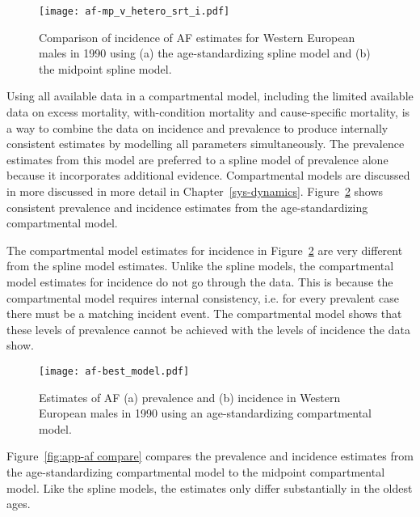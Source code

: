     \begin{figure}[h]
        \begin{center}
            \texttt{[image: af-mp\_v\_hetero\_srt\_i.pdf]}
            \caption{Comparison of incidence of AF estimates for Western European
              males in 1990 using (a) the age-standardizing spline model and (b)
              the midpoint spline model.}
            \label{fig:app-af srt i}
        \end{center}
    \end{figure}

Using all available data in a compartmental model, including the
limited available data on excess mortality, with-condition mortality
and cause-specific mortality, is a way to combine the data on
incidence and prevalence to produce internally consistent estimates by modelling all
parameters simultaneously.  The prevalence estimates from this model
are preferred to a spline model of prevalence alone because it
incorporates additional evidence.  Compartmental models are discussed in
more discussed in more detail in Chapter~\ref{sys-dynamics}.  Figure~\ref{fig:app-af age-stand} shows consistent prevalence and incidence estimates
from the age-standardizing compartmental model.

The compartmental model estimates for incidence in Figure~\ref{fig:app-af age-stand}
are very different from the spline model estimates.
Unlike the spline models, the compartmental model estimates for
incidence do not go through the data.  This is because the compartmental model
requires internal consistency, i.e. for every prevalent case there must be
a matching incident event.  The compartmental model shows that these levels
of prevalence cannot be achieved with the levels of incidence the data show.

    \begin{figure}[h]
        \begin{center}
            \texttt{[image: af-best\_model.pdf]}
            \caption{Estimates of AF (a) prevalence and (b) incidence 
              in Western European males in 1990 using
              an age-standardizing compartmental model.}
            \label{fig:app-af age-stand}
        \end{center}
    \end{figure}

Figure~\ref{fig:app-af compare} compares the prevalence and incidence
estimates from the age-standardizing compartmental model to the
midpoint compartmental model.  Like the spline models, the
estimates only differ substantially in the oldest ages.

